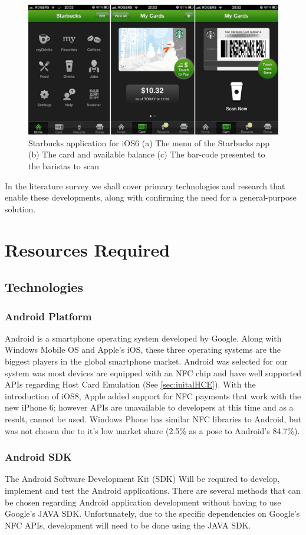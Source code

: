 \begin{figure}[h!]
  \centering
    \includegraphics[width=1\textwidth]{img/starbucks-image-2.jpeg}
      \caption{Starbucks application for iOS6 (a) The menu of the Starbucks app (b) The card and available balance (c) The bar-code presented to the baristas to scan}
      \label{fig:starbucksios6}
\end{figure}

In the literature survey we shall cover primary technologies and research that enable these developments, along with confirming the need for a general-purpose solution.

\section{Resources Required}
\subsection{Technologies}
\subsubsection{Android Platform}
Android is a smartphone operating system developed by Google. Along with Windows Mobile OS and Apple's iOS, these three operating systems are the biggest players in the global smartphone market. Android was selected for our system was most devices are equipped with an NFC chip and have well supported APIs regarding Host Card Emulation (See \ref{sec:initalHCE}). With the introduction of iOS8, Apple added support for NFC payments that work with the new iPhone 6; however APIs are unavailable to developers at this time and as a result, cannot be used. Windows Phone has similar NFC libraries to Android, but was not chosen due to it's low market share (2.5\% as a pose to Android's 84.7\%)\cite{marketShare}. 
\subsubsection{Android SDK}
The Android Software Development Kit (SDK) Will be required to develop, implement and test the Android applications. There are several methods that can be chosen regarding Android application development without having to use Google's JAVA SDK. Unfortunately, due to the specific dependencies on Google's NFC APIs, development will need to be done using the JAVA SDK.
